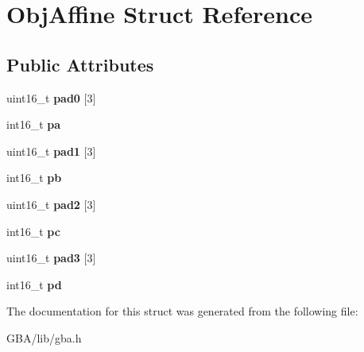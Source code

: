\hypertarget{struct_obj_affine}{\section{Obj\-Affine Struct Reference}
\label{struct_obj_affine}
}
\subsection*{Public Attributes}
\begin{DoxyCompactItemize}
\item 
\hypertarget{struct_obj_affine_a5fdab3616d01dfd6d8440bc61f02a0e4}{uint16\-\_\-t {\bfseries pad0} \mbox{[}3\mbox{]}}\label{struct_obj_affine_a5fdab3616d01dfd6d8440bc61f02a0e4}

\item 
\hypertarget{struct_obj_affine_ae972edc100334aa968f79bb844763564}{int16\-\_\-t {\bfseries pa}}\label{struct_obj_affine_ae972edc100334aa968f79bb844763564}

\item 
\hypertarget{struct_obj_affine_a88ec2e52a1bdabd87a59c8246e30a2ec}{uint16\-\_\-t {\bfseries pad1} \mbox{[}3\mbox{]}}\label{struct_obj_affine_a88ec2e52a1bdabd87a59c8246e30a2ec}

\item 
\hypertarget{struct_obj_affine_a1f9024df291f5a7c32ce2444c8446144}{int16\-\_\-t {\bfseries pb}}\label{struct_obj_affine_a1f9024df291f5a7c32ce2444c8446144}

\item 
\hypertarget{struct_obj_affine_af6e35040fbfc316b1fa138e11752fa46}{uint16\-\_\-t {\bfseries pad2} \mbox{[}3\mbox{]}}\label{struct_obj_affine_af6e35040fbfc316b1fa138e11752fa46}

\item 
\hypertarget{struct_obj_affine_a2fd9f343a9c4a1dd3911f94db706e7ff}{int16\-\_\-t {\bfseries pc}}\label{struct_obj_affine_a2fd9f343a9c4a1dd3911f94db706e7ff}

\item 
\hypertarget{struct_obj_affine_af0a9dcf2ed70d86454ed49f44a894021}{uint16\-\_\-t {\bfseries pad3} \mbox{[}3\mbox{]}}\label{struct_obj_affine_af0a9dcf2ed70d86454ed49f44a894021}

\item 
\hypertarget{struct_obj_affine_a1ae4cd5cf780b89479e4fe39d2377798}{int16\-\_\-t {\bfseries pd}}\label{struct_obj_affine_a1ae4cd5cf780b89479e4fe39d2377798}

\end{DoxyCompactItemize}


The documentation for this struct was generated from the following file\-:\begin{DoxyCompactItemize}
\item 
G\-B\-A/lib/gba.\-h\end{DoxyCompactItemize}
